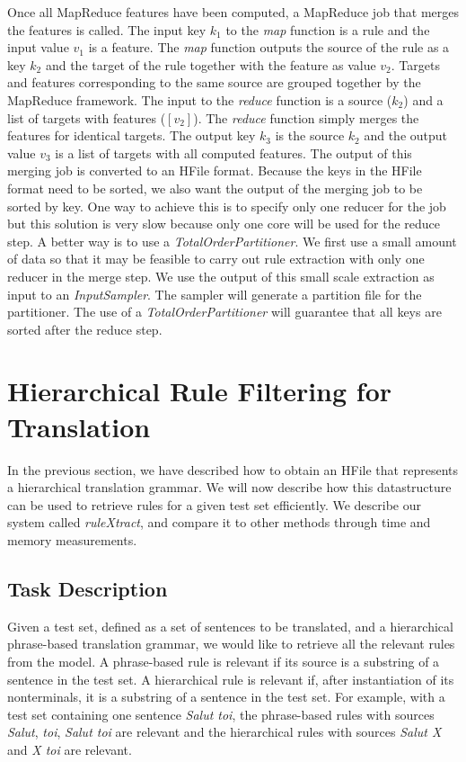 Once all MapReduce features have been computed, a MapReduce job that merges
the features is called. The input key $k_1$ to the \emph{map} function is a
rule and the input value $v_1$ is a feature. The \emph{map} function outputs
the source of the rule as a key $k_2$ and the target of the rule together with
the feature as value $v_2$. Targets and features corresponding to the same
source are grouped together by the MapReduce framework. The input to the
\emph{reduce} function is a source ($k_2$) and a list of targets with features
($[v_2]$). The \emph{reduce} function simply merges the features for identical
targets. The output key $k_3$ is the source $k_2$ and the output value $v_3$ is
a list of targets with all computed features. The output of this merging job
is converted to an HFile format. Because the keys in the HFile format need to
be sorted, we also want the output of the merging job to be sorted by key. One
way to achieve this is to specify only one reducer for the job but this solution
is very slow because only one core will be used for the reduce step. A better
way is to use a \emph{TotalOrderPartitioner}. We first use a small amount of
data so that it may be feasible to carry out rule extraction with only one
reducer in the merge step. We use the output of this small scale extraction as
input to an \emph{InputSampler}. The sampler will generate a partition file for
the partitioner. The use of a \emph{TotalOrderPartitioner} will guarantee that
all keys are sorted after the reduce step.

\section{Hierarchical Rule Filtering for Translation}
\label{sec:rulextract}

In the previous section, we have described how to obtain an HFile
that represents a hierarchical translation grammar.
We will now describe how this datastructure can be used to retrieve rules for
a given test set efficiently. We describe our system called
\emph{ruleXtract}, and compare it to other methods through time and memory
measurements.

\subsection{Task Description}

Given a test set, defined as a set of sentences to be translated, and a
hierarchical phrase-based translation grammar, we would
like to retrieve all the relevant rules from the model. A phrase-based rule is
relevant if its source is a substring of a sentence in the test set. A
hierarchical rule is relevant if, after instantiation of its nonterminals, it is
a substring of a sentence in the test set. For example, with a test set
containing one sentence \emph{Salut toi}, the phrase-based rules with sources
\emph{Salut}, \emph{toi}, \emph{Salut toi} are relevant and the hierarchical
rules with sources \emph{Salut X} and \emph{X toi} are relevant.

